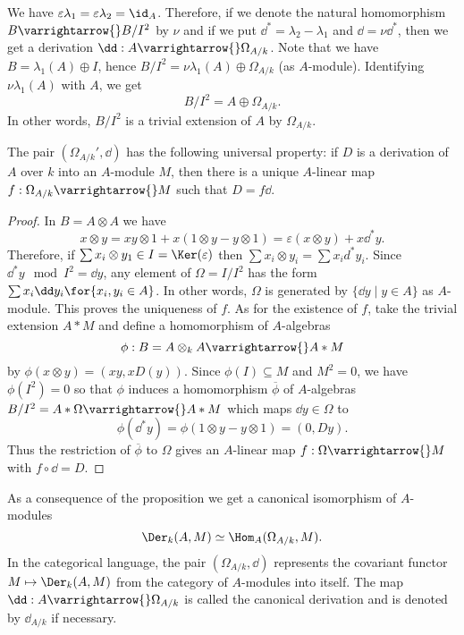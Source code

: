 \documentclass[../main]{subfiles}
\begin{document}
We have $\varepsilon \lambda_1=\varepsilon \lambda_2=\id_A$. Therefore, if we denote the natural homomorphism $B \varrightarrow{} B / I^2$ by $\nu$ and if we put $\dd^\ast=\lambda_2-\lambda_1$ and $\dd=\nu \dd^*$, then we get a derivation $\dd: A \varrightarrow{} \Omega_{A / k}$. Note that we have $B=\lambda_1(A) \oplus I$, hence $B / I^2=\nu \lambda_1(A) \oplus \Omega_{A / k}$ (as $A$-module). Identifying $\nu \lambda_1(A)$ with $A$, we get
\[
B / I^2=A \oplus \Omega_{A/k}.
\]
In other words, $B / I^2$ is a trivial extension of $A$ by $\Omega_{A/k}$.

\begin{proposition}\label{prop:26.01}
The pair $(\Omega_{A/k}', \dd)$ has the following universal property: if $D$ is a derivation of $A$ over $k$ into an $A$-module $M$, then there is a unique $A$-linear map $f: \Omega_{A / k} \varrightarrow{} M$ such that $D=f \dd$.
\end{proposition}
\begin{proof}
In $B=A \otimes A$ we have \[x \otimes y=x y \otimes 1+x(1 \otimes y-y \otimes 1)=\varepsilon(x \otimes y)+x \dd^\ast y.\] Therefore, if $\sum x_i \otimes y_1 \in I=\Ker(\varepsilon)$ then $\sum x_i \otimes y_i=\sum x_i d^{\ast} y_i$. Since $\dd^\ast y \mod I^2=\dd y$, any element of $\Omega= I/ I^2$ has the form $\sum x_i \dd y_i\for{x_i, y_i\in A}$. In other words, $\Omega$ is generated by $\{\dd y \mid y \in A\}$ as $A$-module. This proves the uniqueness of $f$. As for the existence of $f$, take the trivial extension $A\ast M$ and define a homomorphism of $A$-algebras \[\phi: B=A \otimes_k A \varrightarrow{} A \ast M\] by $\phi(x \otimes y)=(x y, x D(y))$. Since $\phi(I) \subseteq M$ and $M^2=0$, we have $\phi(I^2)=0$ so that $\phi$ induces a homomorphism $\overline{\phi}$ of $A$-algebras $B / I^2=A * \Omega \varrightarrow{} A \ast M$ which maps $\dd y \in \Omega$ to \[\phi(\dd^* y)=\phi(1 \otimes y-y \otimes 1)=(0, D y).\] Thus the restriction of $\overline{\phi}$ to $\Omega$ gives an $A$-linear map \newline $f: \Omega \varrightarrow{} M$ with $f \circ \dd=D$.
\end{proof}

As a consequence of the proposition we get a canonical isomorphism of $A$-modules
\[
\Der_k(A, M) \simeq \Hom_A(\Omega_{A/k}, M) .
\]
In the categorical language, the pair $(\Omega_{A/k}, \dd)$ represents the covariant functor $M \mapsto \Der_k(A, M)$ from the category of $A$-modules into itself. The map \newline $\dd: A \varrightarrow{} \Omega_{A / k}$ is called the canonical derivation and is denoted by $\dd_{A / k}$ if necessary.
\end{document}
